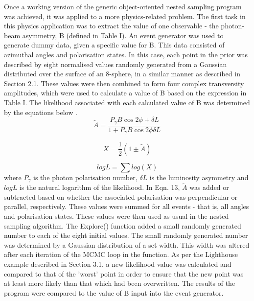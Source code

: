 \documentclass[a4paper,12pt]{article}
\begin{document}
Once a working version of the generic object-oriented nested sampling program was achieved, it was applied to a more physics-related problem.  The first task in this physics application was to extract the value of one observable - the photon-beam asymmetry, B (defined in Table I). An event generator was used to generate dummy data, given a specific value for B.  This data consisted of azimuthal angles and polarisation states.
\newline
In this case, each point in the prior was described by eight normalised values randomly generated from a Gaussian distributed over the surface of an 8-sphere, in a similar manner as described in Section 2.1. %
These values were then combined to form four complex transversity amplitudes, which were used to calculate a value of B based on the expression in Table I.  The likelihood associated with each calculated value of B was determined by the equations below \cite{dgi}.
\begin{equation}
 \tilde{A} = \frac{P_{\gamma}B\cos2\phi + \delta L}{1 + P_{\gamma}B\cos2\phi \delta L}
\end{equation}


\begin{equation}
X = \frac{1}{2}(1 \pm \tilde{A})
\end{equation}

\begin{equation}
logL = \sum log(X)
\end{equation}
where $P_{\gamma}$ is the photon polarisation number, $\delta L$ is the luminosity asymmetry and $logL$ is the natural logarithm of the likelihood.  In Eqn. 13, %
$\tilde{A}$ was added or subtracted based on whether the associated polarisation was perpendicular or parallel, respectively.  These values were summed for all events - that is, all angles and polarisation states.  
\newline
These values were then used as usual in the nested sampling algorithm.  The Explore() function added a small randomly generated number to each of the eight initial values.  The small randomly generated number was determined by a Gaussian distribution of a set width.  This width was altered after each iteration of the MCMC loop in the function.  As per the Lighthouse example described in Section 3.1, a new likelihood value was calculated and compared to that of the 'worst' point in order to ensure that the new point was at least more likely than that which had been overwritten.  The results of the program were compared to the value of B input into the event generator.
\end{document}
